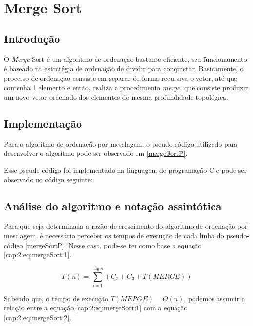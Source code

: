 \section{Merge Sort} \label{cap:2:section:msort}

\subsection{Introdução}

O \textit{Merge} Sort é um algoritmo de ordenação bastante eficiente, seu funcionamento é baseado
na estratégia de ordenação de dividir para conquistar. Basicamente, o processo de ordenação consiste
em separar de forma recursiva o vetor, até que contenha 1 elemento e então, realiza o procedimento
\textit{merge}, que consiste produzir um novo vetor ordenado dos elementos de mesma profundidade
topológica.

\subsection{Implementação}

Para o algoritmo de ordenação por mesclagem, o pseudo-código utilizado para desenvolver o
algoritmo pode ser observado em \ref{mergeSortP}.



Esse pseudo-código foi implementado na linguagem de programação C 
e pode ser observado no código seguinte:



\subsection{Análise do algoritmo e notação assintótica}

Para que seja determinada a razão de crescimento do algoritmo de ordenação por mesclagem, é necessário
perceber os tempos de execução de cada linha do pseudo-código \ref{mergeSortP}.
Nesse caso, pode-se ter como base a equação \ref{cap:2:eq:mergeSort:1}.

\begin{equation} \label{cap:2:eq:mergeSort:1}
    T(n) = \sum_{i=1}^{\log n}(C_2 + C_3 + T(MERGE))
\end{equation}

Sabendo que, o tempo de execução $T(MERGE) = O(n)$, podemos assumir a relação entre a equação 
\ref{cap:2:eq:mergeSort:1} com a equação \ref{cap:2:eq:mergeSort:2}.

